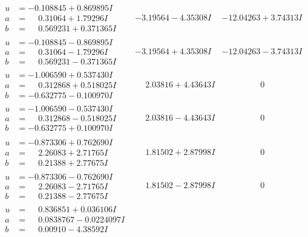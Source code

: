 \documentclass[1p]{elsarticle_modified}
\theoremstyle{definition}
\begin{document}
$$\begin{array}{c|c|c}
\begin{aligned}
u &= -0.108845 + 0.869895 I \\
a &= \phantom{-}0.31064 + 1.79296 I \\
b &= \phantom{-}0.569231 + 0.371365 I\end{aligned}
 & -3.19564 - 4.35308 I & -12.04263 + 3.74313 I \\ \hline\begin{aligned}
u &= -0.108845 - 0.869895 I \\
a &= \phantom{-}0.31064 - 1.79296 I \\
b &= \phantom{-}0.569231 - 0.371365 I\end{aligned}
 & -3.19564 + 4.35308 I & -12.04263 - 3.74313 I \\ \hline\begin{aligned}
u &= -1.006590 + 0.537430 I \\
a &= \phantom{-}0.312868 + 0.518025 I \\
b &= -0.632775 - 0.100970 I\end{aligned}
 & \phantom{-}2.03816 + 4.43643 I & \phantom{-0.000000 } 0 \\ \hline\begin{aligned}
u &= -1.006590 - 0.537430 I \\
a &= \phantom{-}0.312868 - 0.518025 I \\
b &= -0.632775 + 0.100970 I\end{aligned}
 & \phantom{-}2.03816 - 4.43643 I & \phantom{-0.000000 } 0 \\ \hline\begin{aligned}
u &= -0.873306 + 0.762690 I \\
a &= \phantom{-}2.26083 + 2.71765 I \\
b &= \phantom{-}0.21388 + 2.77675 I\end{aligned}
 & \phantom{-}1.81502 + 2.87998 I & \phantom{-0.000000 } 0 \\ \hline\begin{aligned}
u &= -0.873306 - 0.762690 I \\
a &= \phantom{-}2.26083 - 2.71765 I \\
b &= \phantom{-}0.21388 - 2.77675 I\end{aligned}
 & \phantom{-}1.81502 - 2.87998 I & \phantom{-0.000000 } 0 \\ \hline\begin{aligned}
u &= \phantom{-}0.836851 + 0.036106 I \\
a &= \phantom{-}0.0838767 - 0.0224097 I \\
b &= \phantom{-}0.00910 - 4.38592 I\end{aligned}

\end{array}$$
\end{document}

